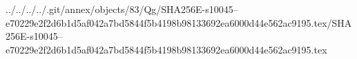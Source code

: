 ../../../../.git/annex/objects/83/Qg/SHA256E-s10045--e70229e2f2d6b1d5af042a7bd5844f5b4198b98133692ea6000d44e562ac9195.tex/SHA256E-s10045--e70229e2f2d6b1d5af042a7bd5844f5b4198b98133692ea6000d44e562ac9195.tex
